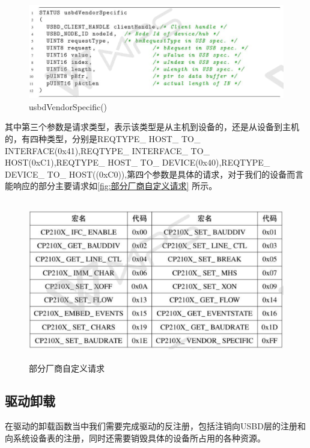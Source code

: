 \begin{figure}[!h]
\centering
\includegraphics[width=1.0\textwidth]{./graphics/usbdVendorSpecify.pdf}
\caption{usbdVendorSpecific()}\label{fig:usbdVendorSpecific}
\end{figure}

其中第三个参数是请求类型，表示该类型是从主机到设备的，还是从设备到主机的，有四种类型，分别是REQTYPE\_ HOST\_ TO\_ INTERFACE(0x41),REQTYPE\_ INTERFACE\_ TO\_ HOST(0xC1),REQTYPE\_ HOST\_ TO\_ DEVICE(0x40),REQTYPE\_ DEVICE\_ TO\_ HOST((0xC0)),第四个参数是具体的请求，对于我们的设备而言能响应的部分主要请求如\autoref{fig:部分厂商自定义请求} 所示。

\begin{figure}[!h]
\centering
\includegraphics[width=12cm ,height=7cm]{./graphics/vendorSpecify.pdf}
\caption{部分厂商自定义请求}\label{fig:部分厂商自定义请求}
\end{figure}


\subsection{驱动卸载}
	在驱动的卸载函数当中我们需要完成驱动的反注册，包括注销向USBD层的注册和向系统设备表的注册，同时还需要销毁具体的设备所占用的各种资源。
	
